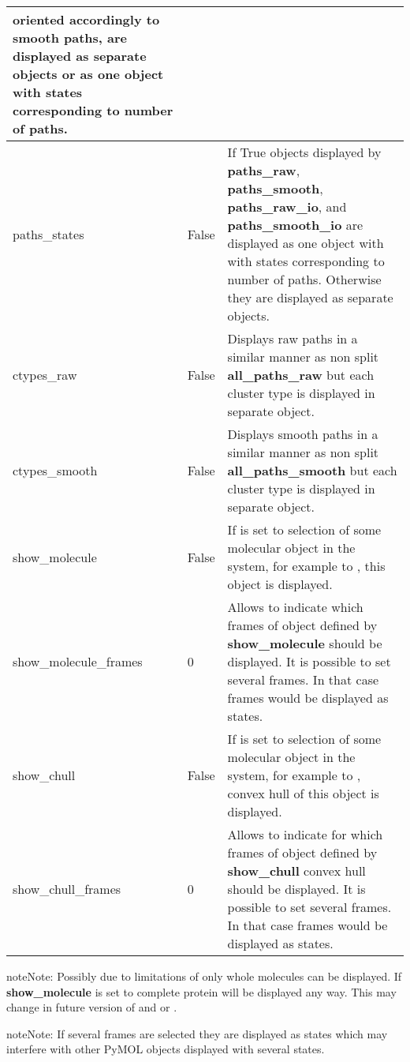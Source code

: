 \documentclass[a4paper,10pt,english]{sphinxmanual}
\begin{document}
\begin{tabulary}{\linewidth}{|L|L|L|}
oriented accordingly to smooth paths, are displayed as separate
objects or as one object with states corresponding to number
of paths.
\\
\hline
paths\_states
&
False
&
If True objects displayed by \textbf{paths\_raw}, \textbf{paths\_smooth},
\textbf{paths\_raw\_io}, and \textbf{paths\_smooth\_io} are displayed as one
object with with states corresponding to number of paths.
Otherwise they are displayed as separate objects.
\\
\hline
ctypes\_raw
&
False
&
Displays raw paths in a similar manner as non split
\textbf{all\_paths\_raw} but each cluster type is displayed in
separate object.
\\
\hline
ctypes\_smooth
&
False
&
Displays smooth paths in a similar manner as non split
\textbf{all\_paths\_smooth} but each cluster type is displayed in
separate object.
\\
\hline
show\_molecule
&
False
&
If is set to selection of some molecular object in the system,
for example to , this object is displayed.
\\
\hline
show\_molecule\_frames
&
0
&
Allows to indicate which frames of object defined by
\textbf{show\_molecule} should be displayed. It is possible to set
several frames. In that case frames would be displayed as
states.
\\
\hline
show\_chull
&
False
&
If is set to selection of some molecular object in the system,
for example to , convex hull of this object is
displayed.
\\
\hline
show\_chull\_frames
&
0
&
Allows to indicate for which frames of object defined by
\textbf{show\_chull} convex hull should be displayed. It is possible
to set several frames. In that case frames would be displayed
as states.
\\
\hline\end{tabulary}


\begin{notice}{note}{Note:}
Possibly due to limitations of  only whole molecules can be displayed. If \textbf{show\_molecule} is set to  complete protein will be displayed any way. This may change in future version of  and or {\hyperref[aqueduct:module\string-aqueduct]{}}.
\end{notice}

\begin{notice}{note}{Note:}
If several frames are selected they are displayed as states which may interfere with other PyMOL objects displayed with several states.
\end{notice}
\end{document}
